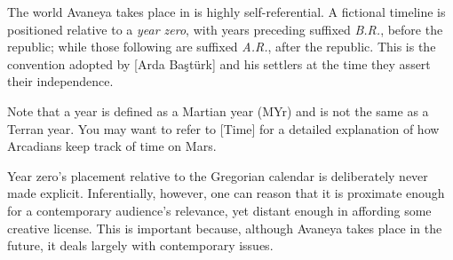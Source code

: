 
The world Avaneya takes place in is highly self-referential. A fictional timeline is positioned relative to a {\it year zero}, with years preceding suffixed {\it B.R.}, before the republic; while those following are suffixed {\it A.R.}, after the republic. This is the convention adopted by [Arda Baştürk] and his settlers at the time they assert their independence.

Note that a year is defined as a Martian year (MYr) and is not the same as a Terran year. You may want to refer to [Time] for a detailed explanation of how Arcadians keep track of time on Mars.

Year zero's placement relative to the Gregorian calendar is deliberately never made explicit. Inferentially, however, one can reason that it is proximate enough for a contemporary audience's relevance, yet distant enough in affording some creative license. This is important because, although Avaneya takes place in the future, it deals largely with contemporary issues.

\startlines
\page 
\page 
\page 
\page 
\page 
\page 
\page 
\stoplines

\StopChapter

